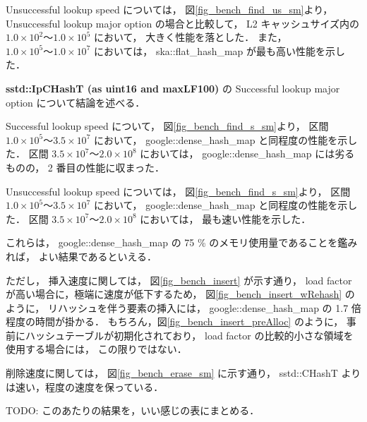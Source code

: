 Unsuccessful lookup speed については，
図\ref{fig_bench_find_us_sm}より，
Unsuccessful lookup major option の場合と比較して，
L2 キャッシュサイズ内の $1.0\times10^2〜1.0\times10^5$ において，
大きく性能を落とした．
また，$1.0\times10^5〜1.0\times10^7$ においては，
ska::flat\_hash\_map が最も高い性能を示した．
\newline

{\bf sstd::IpCHashT (as uint16 and maxLF100)} の Successful lookup major option について結論を述べる．

Successful lookup speed について，
図\ref{fig_bench_find_s_sm}より，
区間 $1.0\times10^5〜3.5\times10^7$ において，
google::dense\_hash\_map と同程度の性能を示した．
区間 $3.5\times10^7〜2.0\times10^8$ においては，
google::dense\_hash\_map には劣るものの，
2 番目の性能に収まった．

Unsuccessful lookup speed については，
図\ref{fig_bench_find_s_sm}より，
区間 $1.0\times10^5〜3.5\times10^7$ において，
google::dense\_hash\_map と同程度の性能を示した．
区間 $3.5\times10^7〜2.0\times10^8$ においては，
最も速い性能を示した．

これらは，
google::dense\_hash\_map の 75 \% のメモリ使用量であることを鑑みれば，
よい結果であるといえる．

ただし，
挿入速度に関しては，
図\ref{fig_bench_insert} が示す通り，
load factor が高い場合に，極端に速度が低下するため，
図\ref{fig_bench_insert_wRehash} のように，
リハッシュを伴う要素の挿入には，
google::dense\_hash\_map の 1.7 倍程度の時間が掛かる．
もちろん，図\ref{fig_bench_insert_preAlloc} のように，
事前にハッシュテーブルが初期化されており，
load factor の比較的小さな領域を使用する場合には，
この限りではない．

削除速度に関しては，
図\ref{fig_bench_erase_sm} に示す通り，
sstd::CHashT よりは速い，程度の速度を保っている．


\leavevmode \newline
\leavevmode \newline
\leavevmode \newline
\leavevmode \newline
\leavevmode \newline
\leavevmode \newline
TODO: このあたりの結果を，いい感じの表にまとめる．
\leavevmode \newline
\leavevmode \newline
\leavevmode \newline
\leavevmode \newline
\leavevmode \newline
\leavevmode \newline

